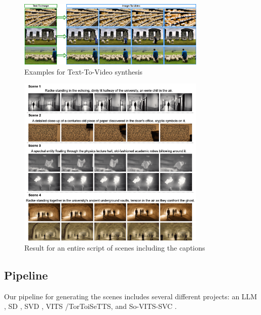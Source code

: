 \documentclass[conference]{IEEEtran}
\begin{document}
\begin{figure}[ht]
    \begin{center}
        \includegraphics[width=0.8\textwidth]{imgs/final-intermediate/sd_to_svd.png}
    \end{center}
    \caption{Examples for Text-To-Video synthesis}
    \label{fig:ttv}
\end{figure}

\begin{figure}[ht]
    \begin{center}
        \includegraphics[width=0.8\textwidth]{imgs/final-intermediate/scenes.png}
    \end{center}
    \caption{Result for an entire script of scenes including the captions}
    \label{fig:script}
\end{figure}


\subsection{Pipeline}
Our pipeline for generating the scenes includes several different projects: an LLM \cite{gpt4}, 
SD \cite{stablediffusion}, SVD \cite{svd}, VITS \cite{vits}/TorToiSeTTS\cite{ttts}, and So-VITS-SVC \cite{sovitssvc-repo}.
\end{document}
